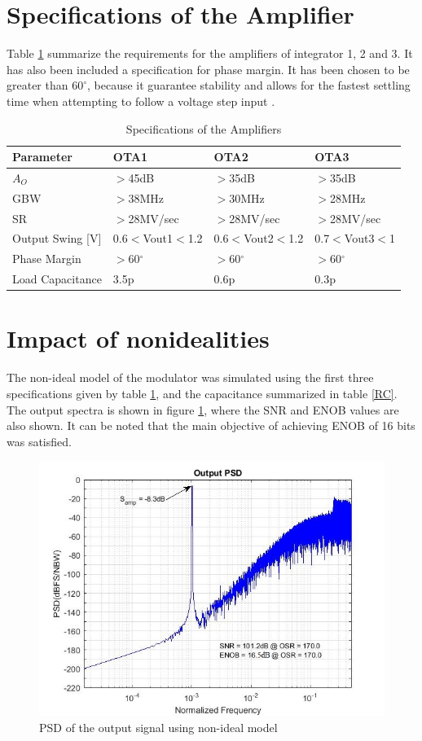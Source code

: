 \section{Specifications of the Amplifier}
Table \ref{spec_ota} summarize the requirements for the amplifiers of integrator 1, 2 and 3. It has also been included a specification for phase margin. It has been chosen to be greater than $60^\circ$, because it guarantee stability and allows for the fastest settling time when attempting to follow a voltage step input \cite{phase}. 

\begin{table}[H]
\centering
\caption{Specifications of the Amplifiers}
\label{spec_ota}
\begin{tabular}{|l|l|l|l|}
\hline
Parameter        & OTA1     & OTA2     & OTA3     \\ \hline
$A_O$             & $>$45dB     & $>$35dB     & $>$35dB     \\ \hline
GBW              & $>$38MHz    & $>$30MHz    & $>$28MHz    \\ \hline
SR               & $>$28MV/sec & $>$28MV/sec & $>$28MV/sec \\ \hline
Output Swing [V]     & 0.6$<$Vout1$<$1.2 & 0.6$<$Vout2$<$1.2  & 0.7$<$Vout3$<$1         \\ \hline
Phase Margin     & $>$60$^\circ$       & $>$60$^\circ$       & $>$60$^\circ$       \\ \hline
Load Capacitance & 3.5p     & 0.6p     & 0.3p     \\ \hline
\end{tabular}
\end{table}

\section{Impact of nonidealities}

The non-ideal model of the modulator was simulated using the first three specifications given by table \ref{spec_ota}, and the capacitance summarized in table \ref{RC}. The output spectra is shown in figure \ref{fig:psd_non_ideal}, where the SNR and ENOB values are also shown. It can be noted that the main objective of achieving ENOB of 16 bits was satisfied.   

\begin{figure}[ht]
\centering
\includegraphics[scale=0.55]{images/psd_out_spec.jpg}
\caption{PSD of the output signal using non-ideal model}
\label{fig:psd_non_ideal}
\end{figure}
